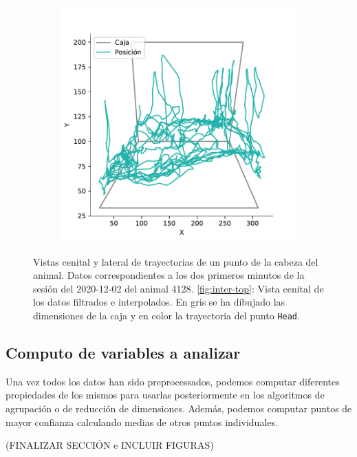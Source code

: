 \begin{figure}[]
\begin{subfigure}{0.45\textwidth}
    \includegraphics[width=\textwidth]{figures/interpolated-trayectory-lateral-4128-2020-12-02.pdf}
    \caption{}
    \label{fig:inter-lateral}
  \end{subfigure}
  \caption[Trayectorias preprocesadas.]{Vistas cenital y lateral de trayectorias de un punto de la cabeza del animal. Datos correspondientes a los dos primeros minutos de la sesión del 2020-12-02 del animal 4128. \ref{fig:inter-top}: Vista cenital de los datos filtrados e interpolados. En gris se ha dibujado las dimensiones de la caja y en color la trayectoria del punto \texttt{Head}.}
  \label{fig:interpolated-trayectories}
\end{figure}


\subsection{Computo de variables a analizar}

Una vez todos los datos han sido preprocessados, podemos computar diferentes propiedades de los mismos para usarlas posteriormente en los algoritmos de agrupación o de reducción de dimensiones. Además, podemos computar puntos de mayor confianza calculando medias de otros puntos individuales.

(FINALIZAR SECCIÓN e INCLUIR FIGURAS)

